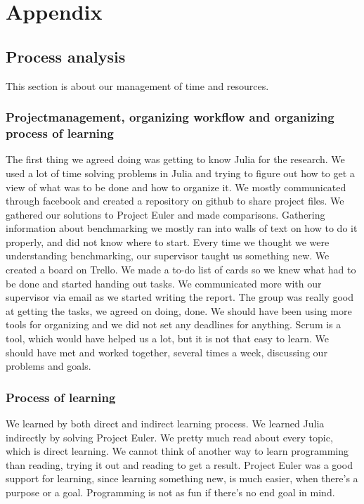 \documentclass[a4paper, 11pt, titlepage]{article}
\begin{document}
\newpage
\section{Appendix}
\subsection{Process analysis}
This section is about our management of time and resources.
\subsubsection{Projectmanagement, organizing workflow and organizing process of learning}
The first thing we agreed doing was getting to know Julia for the research. We used a lot of time solving problems in Julia and trying to figure out how to get a view of what was to be done and how to organize it. We mostly communicated through facebook and created a repository on github to share project files. We gathered our solutions to Project Euler and made comparisons. Gathering information about benchmarking we mostly ran into walls of text on how to do it properly, and did not know where to start. Every time we thought we were understanding benchmarking, our supervisor taught us something new. We created a board on Trello. We made a to-do list of cards so we knew what had to be done and started handing out tasks. We communicated more with our supervisor via email as we started writing the report. The group was really good at getting the tasks, we agreed on doing, done. We should have been using more tools for organizing and we did not set any deadlines for anything. Scrum is a tool, which would have helped us a lot, but it is not that easy to learn. We should have met and worked together, several times a week, discussing our problems and goals. 

\subsubsection{Process of learning}
We learned by both direct and indirect learning process. We learned Julia indirectly by solving Project Euler. We pretty much read about every topic, which is direct learning. We cannot think of another way to learn programming than reading, trying it out and reading to get a result. Project Euler was a good support for learning, since learning something new, is much easier, when there's a purpose or a goal. Programming is not as fun if there's no end goal in mind.
\end{document}
